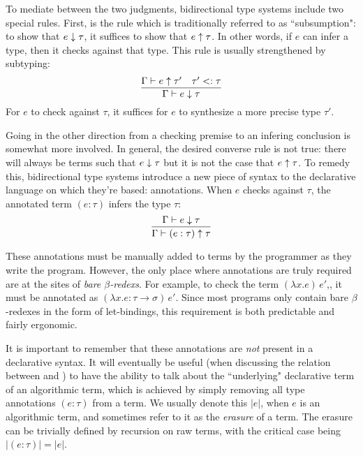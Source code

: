 
To mediate between the two judgments, bidirectional type systems include two special rules. First, is the rule which is traditionally referred to as ``subsumption": to show that $e \downarrow \tau$, it suffices to show that $e \uparrow \tau$. In other words, if $e$ can infer a type, then it checks against that type. This rule is usually strengthened by subtyping:
$$
\infer{\Gamma \vdash e \checks \tau}{\Gamma \vdash e \infers \tau' & \tau' \subty \tau}
$$ For $e$ to check against $\tau$, it suffices for $e$ to synthesize a more precise type $\tau'$.

Going in the other direction from a checking premise to an infering conclusion is somewhat more involved. In general, the desired converse rule is not true: there will always be terms such that $e \downarrow \tau$ but it is not the case that $e \uparrow \tau$. To remedy this, bidirectional type systems introduce a new piece of syntax to the declarative language on which they're based: annotations. When $e$ checks against $\tau$, the annotated term $(e : \tau)$ infers the type $\tau$:
$$
\infer{\Gamma \vdash (e : \tau) \infers \tau}{\Gamma \vdash e \checks \tau}
$$

These annotations must be manually added to terms by the programmer as they write the program. However, the only place where annotations are truly required are at the sites of \textit{bare $\beta$-redexs}. For example, to check the term $(\lambda x. e)\, e'$,, it must be annotated as $(\lambda x.e : \tau \to \sigma) \, e'$. Since most programs only contain bare $\beta$-redexes in the form of let-bindings, this requirement is both predictable and fairly ergonomic.

It is important to remember that these annotations are \textit{not} present in a declarative syntax. It will eventually be useful (when discussing the relation between \bilambdaamor and \dlambdaamor) to have the ability to talk about the ``underlying" declarative term of an algorithmic term, which is achieved by simply removing all type annotations $(e : \tau)$ from a term. We usually denote this $|e|$, when $e$ is an algorithmic term, and sometimes refer to it as the \textit{erasure} of a term. The erasure can be trivially defined by recursion on raw terms, with the critical case being $|(e : \tau)| = |e|$.

